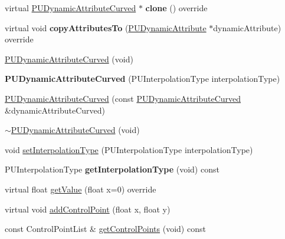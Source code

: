 \begin{DoxyCompactItemize}
\item 
\mbox{\label{classPUDynamicAttributeCurved_af1cfcb35286aac725d8f01e032138856}} 
virtual \hyperlink{classPUDynamicAttributeCurved}{P\+U\+Dynamic\+Attribute\+Curved} $\ast$ {\bfseries clone} () override
\item 
\mbox{\label{classPUDynamicAttributeCurved_acef68961c6dea00a50c984ebf89bf7ab}} 
virtual void {\bfseries copy\+Attributes\+To} (\hyperlink{classPUDynamicAttribute}{P\+U\+Dynamic\+Attribute} $\ast$dynamic\+Attribute) override
\item 
\hyperlink{classPUDynamicAttributeCurved_a12fc9225a908cbe9e4b0d6d18cadd7fe}{P\+U\+Dynamic\+Attribute\+Curved} (void)
\item 
\mbox{\label{classPUDynamicAttributeCurved_a42b631871bb9f97466f5eb2752972996}} 
{\bfseries P\+U\+Dynamic\+Attribute\+Curved} (P\+U\+Interpolation\+Type interpolation\+Type)
\item 
\hyperlink{classPUDynamicAttributeCurved_a784415ec7fc8db1060cd7081fb3ff330}{P\+U\+Dynamic\+Attribute\+Curved} (const \hyperlink{classPUDynamicAttributeCurved}{P\+U\+Dynamic\+Attribute\+Curved} \&dynamic\+Attribute\+Curved)
\item 
\hyperlink{classPUDynamicAttributeCurved_aab42c2e65980043836ec2ab691957684}{$\sim$\+P\+U\+Dynamic\+Attribute\+Curved} (void)
\item 
void \hyperlink{classPUDynamicAttributeCurved_a3464d6f7460c44c22484641ac7c7a759}{set\+Interpolation\+Type} (P\+U\+Interpolation\+Type interpolation\+Type)
\item 
\mbox{\label{classPUDynamicAttributeCurved_aa4e1edb3936c9025eae58b3e1356a82d}} 
P\+U\+Interpolation\+Type {\bfseries get\+Interpolation\+Type} (void) const
\item 
virtual float \hyperlink{classPUDynamicAttributeCurved_a663cc23b856c6fe68913d99364666c38}{get\+Value} (float x=0) override
\item 
virtual void \hyperlink{classPUDynamicAttributeCurved_a694fafe7c6b40bd03bf2861eb0ddf5a6}{add\+Control\+Point} (float x, float y)
\item 
const Control\+Point\+List \& \hyperlink{classPUDynamicAttributeCurved_a9c2c85c69d6cb132105d4907b366ab57}{get\+Control\+Points} (void) const
\item 

\end{DoxyCompactItemize}

